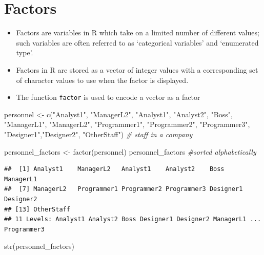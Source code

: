\documentclass[
]{book}
\newenvironment{Shaded}{\begin{snugshade}}{\end{snugshade}}
\newcommand{\CommentTok}[1]{\textcolor[rgb]{0.56,0.35,0.01}{\textit{#1}}}
\newcommand{\FunctionTok}[1]{\textcolor[rgb]{0.00,0.00,0.00}{#1}}
\newcommand{\NormalTok}[1]{#1}
\newcommand{\OtherTok}[1]{\textcolor[rgb]{0.56,0.35,0.01}{#1}}
\newcommand{\StringTok}[1]{\textcolor[rgb]{0.31,0.60,0.02}{#1}}
\providecommand{\tightlist}{%
  \setlength{\itemsep}{0pt}\setlength{\parskip}{0pt}}
\begin{document}
\hypertarget{factors}{%
\section{Factors}\label{factors}}

\begin{itemize}
\tightlist
\item
  Factors are variables in R which take on a limited number of different values; such variables are often referred to as `categorical variables' and `enumerated type'.
\item
  Factors in R are stored as a vector of integer values with a corresponding set of character values to use when the factor is displayed.
\item
  The function \texttt{factor} is used to encode a vector as a factor
\end{itemize}

\begin{Shaded}
\begin{Highlighting}[]
\NormalTok{personnel }\OtherTok{\textless{}{-}} \FunctionTok{c}\NormalTok{(}\StringTok{"Analyst1"}\NormalTok{, }\StringTok{"ManagerL2"}\NormalTok{, }\StringTok{"Analyst1"}\NormalTok{, }\StringTok{"Analyst2"}\NormalTok{,}
               \StringTok{"Boss"}\NormalTok{, }\StringTok{"ManagerL1"}\NormalTok{, }\StringTok{"ManagerL2"}\NormalTok{, }\StringTok{"Programmer1"}\NormalTok{,}
               \StringTok{"Programmer2"}\NormalTok{, }\StringTok{"Programmer3"}\NormalTok{, }\StringTok{"Designer1"}\NormalTok{,}\StringTok{"Designer2"}\NormalTok{,}
               \StringTok{"OtherStaff"}\NormalTok{)  }\CommentTok{\# staff in a company}

\NormalTok{personnel\_factors }\OtherTok{\textless{}{-}} \FunctionTok{factor}\NormalTok{(personnel)}
\NormalTok{personnel\_factors  }\CommentTok{\#sorted alphabetically}
\end{Highlighting}
\end{Shaded}

\begin{verbatim}
##  [1] Analyst1    ManagerL2   Analyst1    Analyst2    Boss        ManagerL1  
##  [7] ManagerL2   Programmer1 Programmer2 Programmer3 Designer1   Designer2  
## [13] OtherStaff 
## 11 Levels: Analyst1 Analyst2 Boss Designer1 Designer2 ManagerL1 ... Programmer3
\end{verbatim}

\begin{Shaded}
\begin{Highlighting}[]
\FunctionTok{str}\NormalTok{(personnel\_factors)}
\end{Highlighting}
\end{Shaded}
\end{document}
